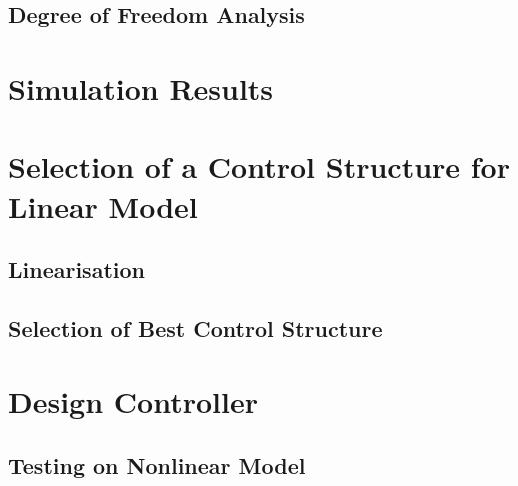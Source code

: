 \documentclass[paper=letter, fontsize=12pt]{article}
\begin{document}
\subsection{}

\subsection{Degree of Freedom Analysis}


\section{Simulation Results}





\section{Selection of a Control Structure for Linear Model}
\subsection{Linearisation}
\subsection{Selection of Best Control Structure}






\section{Design Controller}
\subsection{Testing on Nonlinear Model}










\end{document}
